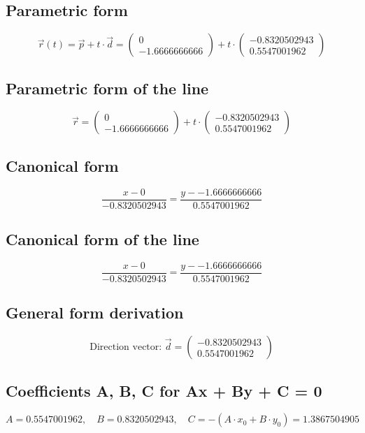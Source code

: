 \documentclass{article}
\begin{document}
\subsection*{ \vspace{1em} Parametric form}
\[
\vec{r}(t) = \vec{p} + t \cdot \vec{d} = \begin{pmatrix}0 \\ -1.6666666666\end{pmatrix} + t \cdot \begin{pmatrix}-0.8320502943 \\ 0.5547001962\end{pmatrix}
\]
\subsection*{ \vspace{1em} Parametric form of the line}
\[
\vec{r} = \begin{pmatrix}0 \\ -1.6666666666\end{pmatrix} + t \cdot \begin{pmatrix}-0.8320502943 \\ 0.5547001962\end{pmatrix}
\]
\subsection*{ \vspace{1em} Canonical form}
\[
\frac{x - 0}{-0.8320502943} = \frac{y - -1.6666666666}{0.5547001962}
\]
\subsection*{ \vspace{1em} Canonical form of the line}
\[
\frac{x - 0}{-0.8320502943} = \frac{y - -1.6666666666}{0.5547001962}
\]
\subsection*{ \vspace{1em} General form derivation}
\[
\text{Direction vector: } \vec{d} = \begin{pmatrix}-0.8320502943 \\ 0.5547001962\end{pmatrix}
\]
\subsection*{ \vspace{1em} Coefficients A, B, C for Ax + By + C = 0}
\[
A = 0.5547001962,\quad B = 0.8320502943,\quad C = - (A \cdot x_0 + B \cdot y_0) = 1.3867504905
\]
\end{document}
